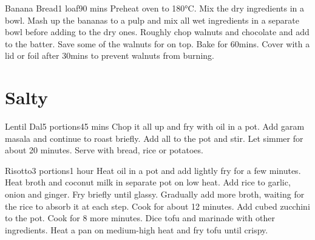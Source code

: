 \documentclass[]{article}
\begin{document}
\begin{center}
	\begin{recipe}{Banana Bread}{1 loaf}{90 mins}
		Preheat oven to 180°C. Mix the dry ingredients in a bowl.
		Mash up the bananas to a pulp and mix all wet ingredients in a separate bowl before adding to the dry ones.
		Roughly chop walnuts and chocolate and add to the batter. Save some of the walnuts for on top.
		\newstep
		\freeform Bake for 60mins. Cover with a lid or foil after 30mins to prevent walnuts from burning. 
		\freeform\hrulefill
	\end{recipe}
	
	\section{Salty}
	\begin{recipe}{Lentil Dal}{5 portions}{45 mins}
		Chop it all up and fry with oil in a pot.
		Add garam masala and continue to roast briefly.
		Add all to the pot and stir.
		Let simmer for about 20 minutes.
		\freeform Serve with bread, rice or potatoes.
		\freeform\hrulefill
	\end{recipe}
	
	\begin{recipe}{Risotto}{3 portions}{1 hour}
		Heat oil in a pot and add lightly fry for a few minutes.
		Heat broth and coconut milk in separate pot on low heat.
		Add rice to garlic, onion and ginger. 
		Fry briefly until glassy.
		\newstep
		Gradually add more broth, waiting for the rice to absorb it at each step.
		Cook for about 12 minutes.
		Add cubed zucchini to the pot. 
		Cook for 8 more minutes.
		Dice tofu and marinade with other ingredients.
		Heat a pan on medium-high heat and fry tofu until crispy.
		\freeform\hrulefill
	\end{recipe}
	

\end{center}
\end{document}
